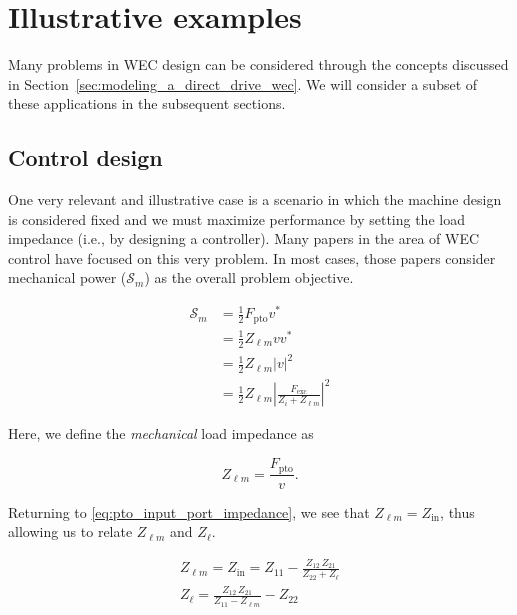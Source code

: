 \documentclass[lettersize,journal]{IEEEtran}
\begin{document}
\section{Illustrative examples}\label{sec:illustrative_examples}
Many problems in WEC design can be considered through the concepts discussed in Section~\ref{sec:modeling_a_direct_drive_wec}.
We will consider a subset of these applications in the subsequent sections.

\subsection{Control design}\label{sec:control_design}
One very relevant and illustrative case is a scenario in which the machine design is considered fixed and we must maximize performance by setting the load impedance (i.e., by designing a controller).
Many papers in the area of WEC control have focused on this very problem.
In most cases, those papers consider mechanical power ($\mathcal{S}_{m}$) as the overall problem objective.

\begin{equation}
\begin{aligned}
        \mathcal{S}_{m} 
        &= \frac{1}{2} F_{\textrm{pto}} v^* \\
        &= \frac{1}{2}Z_{\ell m} v v^* \\
        &= \frac{1}{2}Z_{\ell m} | v |^2 \\
        &= \frac{1}{2} Z_{\ell m} \left| \frac{F_{\textrm{exc}}}{Z_i + Z_{\ell m}} \right|^2
\end{aligned}
\end{equation}

\noindent{}Here, we define the \emph{mechanical} load impedance as

\begin{equation}
        Z_{\ell m} = \frac{F_{\textrm{pto}}}{v} .
\end{equation}

\noindent{}Returning to \eqref{eq:pto_input_port_impedance}, we see that $Z_{\ell m}=Z_{\textrm{in}}$, thus allowing us to relate $Z_{\ell m}$ and $Z_{\ell}$.

\begin{subequations}
        \begin{gather}
                Z_{\ell m} =Z_{\textrm{in}} = Z_{11} - \frac{Z_{12} \, Z_{21}}{Z_{22} + Z_\ell} \\
                Z_\ell = \frac{Z_{12} \,Z_{21} }{Z_{11} -Z_{\ell m}}-Z_{22}
        \end{gather}
        \label{eq:Zl_Zlm}
\end{subequations}
\end{document}
